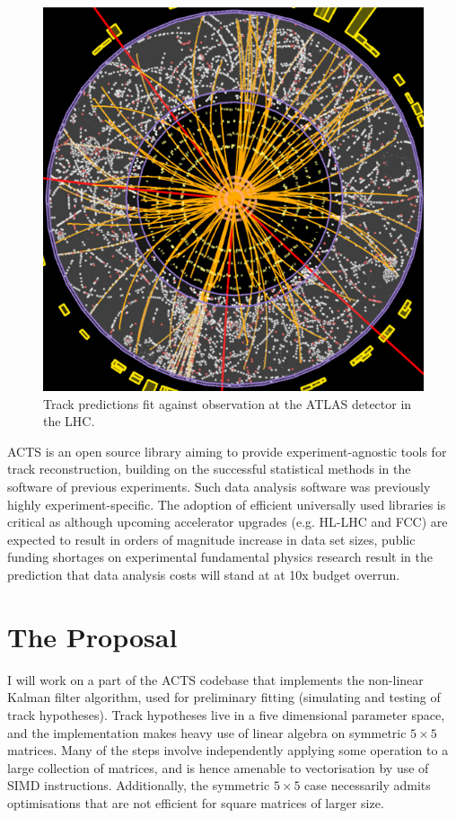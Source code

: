 \documentclass[12pt]{amsart}
\begin{document}
\begin{figure}[h]
\includegraphics[scale=0.3]{ATLAS}
\caption*{Track predictions fit against observation at the ATLAS detector in the LHC.}
\centering
\end{figure}

ACTS is an open source library aiming to provide experiment-agnostic tools for track reconstruction, building on the successful statistical methods in the software of previous experiments. Such data analysis software was previously highly experiment-specific. The adoption of efficient universally used libraries is critical as although upcoming accelerator upgrades (e.g. HL-LHC and FCC) are expected to result in orders of magnitude increase in data set sizes, public funding shortages on experimental fundamental physics research result in the prediction that data analysis costs will stand at at 10x budget overrun.

\section*{The Proposal}

I will work on a part of the ACTS codebase that implements the non-linear Kalman filter algorithm, used for preliminary fitting (simulating and testing of track hypotheses). Track hypotheses live in a five dimensional parameter space, and the implementation makes heavy use of linear algebra on symmetric $5 \times 5$ matrices. Many of the steps involve independently applying some operation to a large collection of matrices, and is hence amenable to vectorisation by use of SIMD instructions. Additionally, the symmetric $5 \times 5$ case necessarily admits optimisations that are not efficient for square matrices of larger size.
\end{document}
